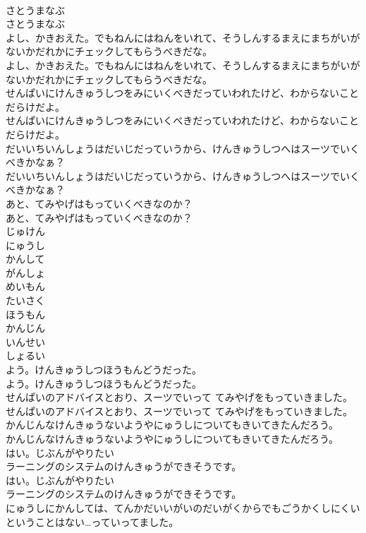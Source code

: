 \documentclass[8pt]{extreport}
\begin{document}
\begin{CJK}{UTF8}{min}
\\	さとうまなぶ
\\	さとうまなぶ
\\	よし、かきおえた。でもねんにはねんをいれて、そうしんするまえにまちがいがないかだれかにチェックしてもらうべきだな。
\\	よし、かきおえた。でもねんにはねんをいれて、そうしんするまえにまちがいがないかだれかにチェックしてもらうべきだな。
\\	せんぱいにけんきゅうしつをみにいくべきだっていわれたけど、わからないことだらけだよ。
\\	せんぱいにけんきゅうしつをみにいくべきだっていわれたけど、わからないことだらけだよ。
\\	だいいちいんしょうはだいじだっていうから、けんきゅうしつへはスーツでいくべきかなぁ？
\\	だいいちいんしょうはだいじだっていうから、けんきゅうしつへはスーツでいくべきかなぁ？
\\	あと、てみやげはもっていくべきなのか？
\\	あと、てみやげはもっていくべきなのか？
\\	じゅけん
\\	にゅうし
\\	かんして
\\	がんしょ
\\	めいもん
\\	たいさく
\\	ほうもん
\\	かんじん
\\	いんせい
\\	しょるい
\\	よう。けんきゅうしつほうもんどうだった。
\\	よう。けんきゅうしつほうもんどうだった。
\\	せんぱいのアドバイスとおり、スーツでいって てみやげをもっていきました。
\\	せんぱいのアドバイスとおり、スーツでいって てみやげをもっていきました。
\\	かんじんなけんきゅうないようやにゅうしについてもきいてきたんだろう。
\\	かんじんなけんきゅうないようやにゅうしについてもきいてきたんだろう。
\\	はい。じぶんがやりたい
\\	ラーニングのシステムのけんきゅうができそうです。
\\	はい。じぶんがやりたい
\\	ラーニングのシステムのけんきゅうができそうです。
\\	にゅうしにかんしては、てんかだいいがいのだいがくからでもごうかくしにくいということはない…っていってました。

\end{CJK}
\end{document}

